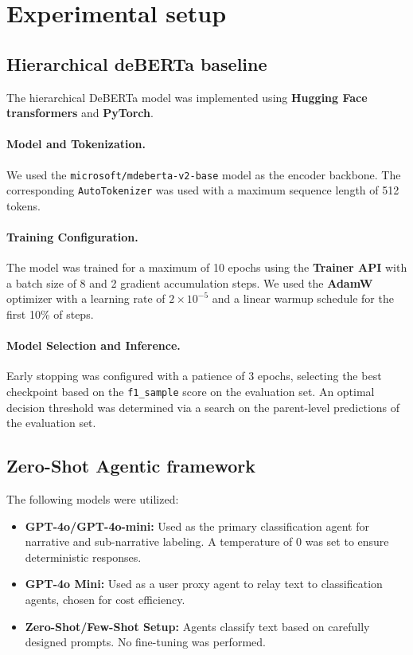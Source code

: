 \section{Experimental setup}

\subsection{Hierarchical deBERTa baseline}

The hierarchical DeBERTa model was implemented using \textbf{Hugging Face transformers} \cite{wolf-etal-2020-transformers} and \textbf{PyTorch}.

\paragraph{Model and Tokenization.}
We used the \texttt{microsoft/mdeberta-v2-base} model as the encoder backbone. The corresponding \texttt{AutoTokenizer} was used with a maximum sequence length of 512 tokens.

\paragraph{Training Configuration.}
The model was trained for a maximum of 10 epochs using the \textbf{Trainer API} with a batch size of 8 and 2 gradient accumulation steps. We used the \textbf{AdamW} optimizer with a learning rate of \(2 \times 10^{-5}\) and a linear warmup schedule for the first 10\% of steps.

\paragraph{Model Selection and Inference.}
Early stopping was configured with a patience of 3 epochs, selecting the best checkpoint based on the \texttt{f1\_sample} score on the evaluation set. An optimal decision threshold was determined via a search on the parent-level predictions of the evaluation set.

\subsection{Zero-Shot Agentic framework}

The following models were utilized:

\begin{itemize}
  \item \textbf{GPT-4o/GPT-4o-mini:} Used as the primary classification agent for narrative and sub-narrative labeling. A temperature of 0 was set to ensure deterministic responses.
  \item \textbf{GPT-4o Mini:} Used as a user proxy agent to relay text to classification agents, chosen for cost efficiency.
  \item \textbf{Zero-Shot/Few-Shot Setup:} Agents classify text based on carefully designed prompts. No fine-tuning was performed.
\end{itemize}

